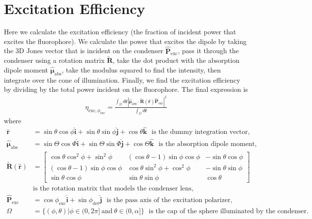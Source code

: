 \documentclass[11pt]{article}
\providecommand{\mb}[1]{\mathbf{#1}}
\providecommand{\mh}[1]{\mathbf{\hat{#1}}}
\providecommand{\bs}[1]{\boldsymbol{#1}}
\begin{document}
\section{Excitation Efficiency}
Here we calculate the excitation efficiency (the fraction of incident power that
excites the fluorophore). We calculate the power that excites the dipole by
taking the 3D Jones vector that is incident on the condenser
$\mh{P}_{\text{exc}}$, pass it through the condenser using a rotation matrix
$\tilde{\mb{R}}$, take the dot product with the absorption dipole moment
$\hat{\bs{\mu}}_{\text{abs}}$, take the modulus squared to find the intensity,
then integrate over the cone of illumination. Finally, we find the excitation
efficiency by dividing by the total power incident on the fluorophore. The final
expression is
\begin{align}
  \eta_{\text{exc},\phi_{\text{exc}}} = \frac{\int_{\Omega}d\mh{r}|\hat{\bs{\mu}}_{\text{abs}}\cdot\tilde{\mb{R}}(\mh{r})\mh{P}_{\text{exc}}|^2}{\int_{\Omega}d\mh{r}}\label{eq:finalexc}
\end{align}
where
\begin{align}
  \hat{\mb{r}} &= \sin\theta\cos\phi\hat{\mb{i}} + \sin\theta\sin\phi\hat{\mb{j}} + \cos\theta\hat{\mb{k}}\label{eq:r_coords2}\ \ \ \text{is the dummy integration vector,}\\
  \hat{\bs{\mu}}_{\text{abs}} &= \sin\Theta\cos\Phi\hat{\mb{i}} + \sin\Theta\sin\Phi\hat{\mb{j}} + \cos\Theta\hat{\mb{k}}\ \ \ \text{is the absorption dipole moment,}\label{eq:mu_coords}\\
  \tilde{\mb{R}}(\mh{r}) &= \begin{bmatrix} \cos\theta\cos^2\phi + \sin^2\phi & (\cos\theta -1)\sin\phi\cos\phi & -\sin\theta\cos\phi\\ (\cos\theta - 1)\sin\phi\cos\phi & \cos\theta\sin^2\phi + \cos^2\phi & -\sin\theta\sin\phi \\ \sin\theta\cos\phi& \sin\theta\sin\phi & \cos\theta \end{bmatrix}\label{eq:matrix}\\&\text{is the rotation matrix that models the condenser lens,}\\
  \hat{\mb{P}}_{\text{exc}} &= \cos\phi_{\text{exc}}\hat{\mb{i}} + \sin\phi_{\text{det}}\hat{\mb{j}}\ \ \ \text{is the pass axis of the excitation polarizer,}\\
  \Omega &= \{(\phi, \theta)|\phi \in (0,2\pi]\ \text{and}\ \theta\in (0, \alpha]\}\ \ \ \text{is the cap of the sphere illuminated by the condenser.}\label{eq:omega2}
\end{align}
\end{document}
